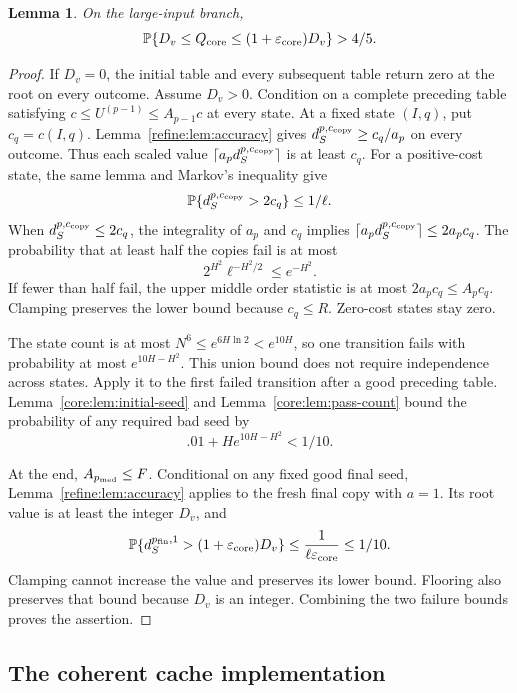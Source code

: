 \documentclass[11pt]{article}
\newtheorem{lemma}[theorem]{Lemma}
\theoremstyle{definition}
\newcommand{\Prb}{\mathbb P}
\newcommand{\1}{\mathbf 1}
\begin{document}
\begin{lemma}\label{core:lem:scheme-accuracy}
On the large-input branch,
\[
 \Prb\{D_v\le Q_{\rm core}
                 \le(1+\varepsilon_{\rm core})D_v\}>4/5.
\]
\end{lemma}
\begin{proof}
If $D_v=0$, the initial table and every subsequent table return zero at
the root on every outcome. Assume $D_v>0$.
Condition on a complete preceding table satisfying
$c\le U^{(p-1)}\le A_{p-1}c$ at every state.
At a fixed state $(I,q)$, put $c_q=c(I,q)$.
Lemma~\ref{refine:lem:accuracy} gives
$d_S^{p,c_{\rm copy}}\ge c_q/a_p$ on every outcome.
Thus each scaled value $\lceil a_p d_S^{p,c_{\rm copy}}\rceil$
is at least $c_q$.
For a positive-cost state, the same lemma and Markov's inequality give
\[
 \Prb\{d_S^{p,c_{\rm copy}}>2c_q\}\le1/\ell.
\]
When $d_S^{p,c_{\rm copy}}\le2c_q$, the integrality of $a_p$ and $c_q$
implies $\lceil a_p d_S^{p,c_{\rm copy}}\rceil\le2a_pc_q$.
The probability that at least half the copies fail is at most
\[
 2^{H^2}\ell^{-H^2/2}\le e^{-H^2}.
\]
If fewer than half fail, the upper middle order statistic is at most
$2a_pc_q\le A_pc_q$.
Clamping preserves the lower bound because $c_q\le R$.
Zero-cost states stay zero.

The state count is at most $N^6\le e^{6H\ln2}<e^{10H}$, so one
transition fails with probability at most $e^{10H-H^2}$.
This union bound does not require independence across states.
Apply it to the first failed transition after a good preceding table.
Lemma~\ref{core:lem:initial-seed} and
Lemma~\ref{core:lem:pass-count} bound the probability of any required bad
seed by
\[
 .01+H e^{10H-H^2}<1/10.
\]

At the end, $A_{p_{\rm med}}\le F$.
Conditional on any fixed good final seed,
Lemma~\ref{refine:lem:accuracy} applies to the fresh final copy with $a=1$.
Its root value is at least the integer $D_v$, and
\[
 \Prb\{d_S^{p_{\rm fin},1}>
             (1+\varepsilon_{\rm core})D_v\}
 \le\frac1{\ell\varepsilon_{\rm core}}\le1/10.
\]
Clamping cannot increase the value and preserves its lower bound.
Flooring also preserves that bound because $D_v$ is an integer.
Combining the two failure bounds proves the assertion.
\end{proof}

\subsection{The coherent cache implementation}
\end{document}
